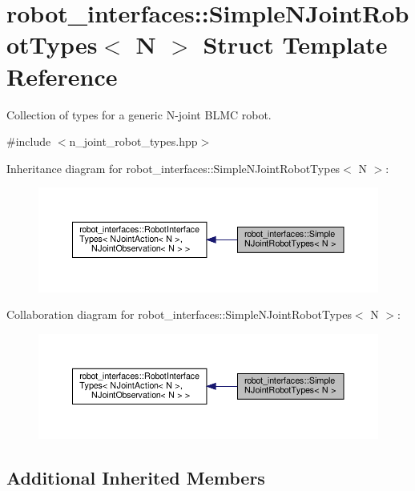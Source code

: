 \hypertarget{structrobot__interfaces_1_1SimpleNJointRobotTypes}{}\section{robot\+\_\+interfaces\+:\+:Simple\+N\+Joint\+Robot\+Types$<$ N $>$ Struct Template Reference}
\label{structrobot__interfaces_1_1SimpleNJointRobotTypes}


Collection of types for a generic N-\/joint B\+L\+MC robot.  




{\ttfamily \#include $<$n\+\_\+joint\+\_\+robot\+\_\+types.\+hpp$>$}



Inheritance diagram for robot\+\_\+interfaces\+:\+:Simple\+N\+Joint\+Robot\+Types$<$ N $>$\+:
\nopagebreak
\begin{figure}[H]
\begin{center}
\leavevmode
\includegraphics[width=350pt]{structrobot__interfaces_1_1SimpleNJointRobotTypes__inherit__graph}
\end{center}
\end{figure}


Collaboration diagram for robot\+\_\+interfaces\+:\+:Simple\+N\+Joint\+Robot\+Types$<$ N $>$\+:
\nopagebreak
\begin{figure}[H]
\begin{center}
\leavevmode
\includegraphics[width=350pt]{structrobot__interfaces_1_1SimpleNJointRobotTypes__coll__graph}
\end{center}
\end{figure}
\subsection*{Additional Inherited Members}


